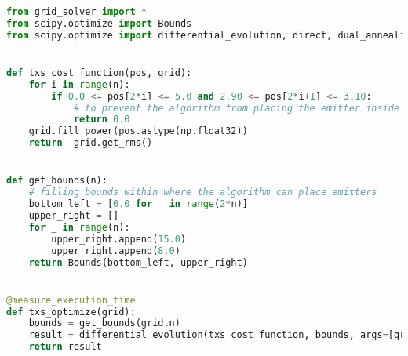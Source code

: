 \begin{lstlisting}[language=python]
from grid_solver import *
from scipy.optimize import Bounds
from scipy.optimize import differential_evolution, direct, dual_annealing, shgo


def txs_cost_function(pos, grid):
    for i in range(n):
        if 0.0 <= pos[2*i] <= 5.0 and 2.90 <= pos[2*i+1] <= 3.10:
            # to prevent the algorithm from placing the emitter inside this wall
            return 0.0
    grid.fill_power(pos.astype(np.float32))
    return -grid.get_rms()


def get_bounds(n):
    # filling bounds within where the algorithm can place emitters
    bottom_left = [0.0 for _ in range(2*n)]
    upper_right = []
    for _ in range(n):
        upper_right.append(15.0)
        upper_right.append(8.0)
    return Bounds(bottom_left, upper_right)


@measure_execution_time
def txs_optimize(grid):
    bounds = get_bounds(grid.n)
    result = differential_evolution(txs_cost_function, bounds, args=[grid], strategy='best1bin', popsize=40)
    return result

\end{lstlisting}